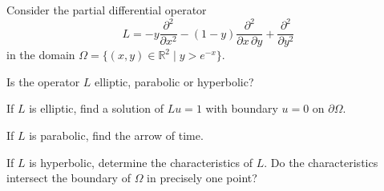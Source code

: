 Consider the partial differential operator
\begin{equation}
L
=
-y
\frac{\partial^2}{\partial x^2}
-
(1-y)
\frac{\partial^2}{\partial x\,\partial y}
+
\frac{\partial^2}{\partial y^2}
\label{90000020:operator}
\end{equation}
in the domain $\Omega=\{(x,y)\in\mathbb R^2\;|\; y > e^{-x}\}$.
\begin{teilaufgaben}
\item
Is the operator $L$ elliptic, parabolic or hyperbolic?
\item
If $L$ is elliptic, find a solution of $Lu=1$ with boundary $u=0$
on $\partial\Omega$.
\item
If $L$ is parabolic, find the arrow of time.
\item
If $L$ is hyperbolic, determine the characteristics of $L$.
Do the characteristics intersect the boundary of $\Omega$ in precisely
one point?
\end{teilaufgaben}

